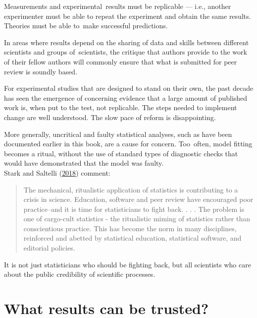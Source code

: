 \documentclass[
  10ptls,
  b5paper]{book}
\begin{document}
Measurements and experimental~results must be replicable
--- i.e., another experimenter must be able to repeat the
experiment and obtain the same results. Theories must
be able to~make successful predictions.

In areas where results depend on the sharing of data and
skills between different scientists and groups of~scientists,
the critique that authors provide to the work of their fellow
authors will commonly ensure that what is submitted for peer
review is soundly based.

For experimental studies that are designed to stand on
their own, the past decade has seen the emergence of
concerning evidence that a large amount of published
work is, when put to the test, not replicable. The
steps needed to implement change are well understood.
The slow pace of reform is disappointing.

More generally, uncritical and faulty statistical analyses,
such as have been documented earlier in this book, are a
cause for concern. Too~often, model fitting becomes a ritual,
without the use of standard types of diagnostic checks that
would have demonstrated that the model was faulty.\\
Stark and Saltelli (\protect\hyperlink{ref-stark2018cargo}{2018}) comment:

\begin{quote}
The mechanical, ritualistic application of statistics is contributing to a crisis in science. Education, software and peer review have encouraged poor practice--and it is time for statisticians to fight back.
. . .
The problem is one of cargo-cult statistics - the ritualistic miming of
statistics rather than conscientious practice. This has become the norm
in many disciplines, reinforced and abetted by statistical education,
statistical software, and editorial policies.
\end{quote}

It is not just statisticians who should be fighting back, but all
scientists who care about the public credibility of scientific
processes.

\hypertarget{what-results-can-be-trusted}{%
\section{What results can be trusted?}\label{what-results-can-be-trusted}}
\end{document}
